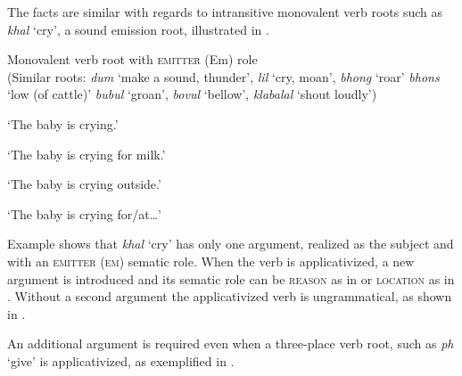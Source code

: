 \documentclass[output=paper]{langsci/langscibook}
\begin{document}
 The facts are similar with regards to intransitive monovalent verb roots such as \textit{khal} ‘cry’, a sound emission root, illustrated in . 

\ea\label{ex:sibanda:3}
\settowidth{}
{Monovalent verb root with \textsc{emitter} (Em) role}\\
 (Similar roots: \textit{dum} ‘make a sound, thunder’, \textit{lil} ‘cry, moan’, \textit{bhong} ‘roar’ \textit{bhons} ‘low (of cattle)’ \textit{bubul} ‘groan’, \textit{bovul} ‘bellow’, \textit{klabalal} ‘shout loudly’)\\

\glt ‘The baby is crying.’


\glt ‘The baby is crying for milk.’ 

\glt ‘The baby is crying outside.’


\glt ‘The baby is crying for/at…’
\z
\z

Example  shows that \textit{khal} ‘cry’ has only one argument, realized as the subject and with an \textsc{emitter} (\textsc{em}) sematic role. When the verb is applicativized, a new argument is introduced and its sematic role can be \textsc{reason} as in  or \textsc{location} as in . Without a second argument the applicativized verb is ungrammatical, as shown in .

 An additional argument is required even when a three-place verb root, such as \textit{ph} ‘give’ is applicativized, as exemplified in . 
\end{document}
